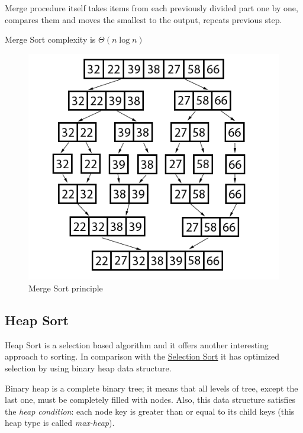 \documentclass[
  field=inf,
  biblatex,
  language=english,
  glossaries,
  index
]{kidiplom}
\begin{document}
Merge procedure itself takes items from each previously divided part one by one, compares them and moves the smallest to the output, repeats previous step.

Merge Sort complexity is $\Theta(n \log n)$

\begin{figure}[H]
\begin{center}
	
	\includegraphics[scale=2.5]{img/Mergesort.png}
	\caption{Merge Sort principle}\label{fig:insert}
\end{center}
\end{figure}

\subsection{Heap Sort}

Heap Sort is a selection based algorithm and it offers another interesting approach to sorting. In comparison with the \hyperref[sec:selection]{Selection Sort} it has optimized selection by using binary heap data structure. 

Binary heap is a complete binary tree; it means that all levels of tree, except the last one, must be completely filled with nodes. Also, this data structure satisfies the \textit{heap condition}: each node key is greater than or equal to its child keys (this heap type is called \textit{max-heap}).
\end{document}
